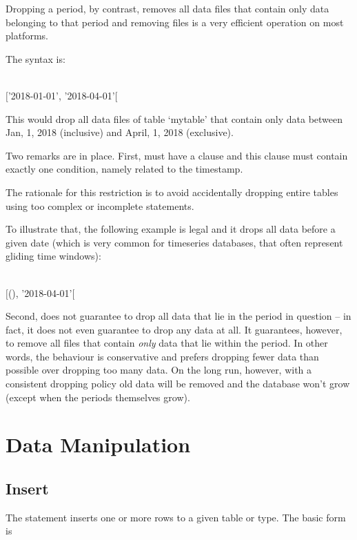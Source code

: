 Dropping a period, by contrast, removes all data files 
that contain only data belonging to that period and
removing files is a very efficient
operation on most platforms.

The syntax is:

\begin{minipage}{\textwidth}
  \\
 $[$'2018-01-01', '2018-04-01'$[$
\end{minipage}

This would drop all data files of table `mytable'
that contain only data between Jan, 1, 2018 (inclusive) and
April, 1, 2018 (exclusive). 

Two remarks are in place. First,
 must have a  clause
and this clause must contain exactly one condition,
namely  related to the timestamp.

The rationale for this restriction is
to avoid accidentally dropping entire tables
using too complex or incomplete  statements.

To illustrate that, the following example 
is legal and it drops all data
before a given date (which is very common
for timeseries databases, that often represent gliding
time windows):

\begin{minipage}{\textwidth}
  \\
$[$(), '2018-04-01'$[$
\end{minipage}

Second,  does not guarantee
to drop all data that lie in the period in question --
in fact, it does not even guarantee to drop any data at all.
It guarantees, however, to remove all files
that contain \emph{only} data that lie within the period.
In other words, the behaviour is conservative
and prefers dropping fewer data than possible over
dropping too many data.
On the long run, however, with a consistent dropping policy
old data will be removed and the database
won't grow (except when the periods themselves grow).

\section{Data Manipulation}
\subsection{Insert}
The  statement inserts one or more rows
to a given table or type.
The basic form is

